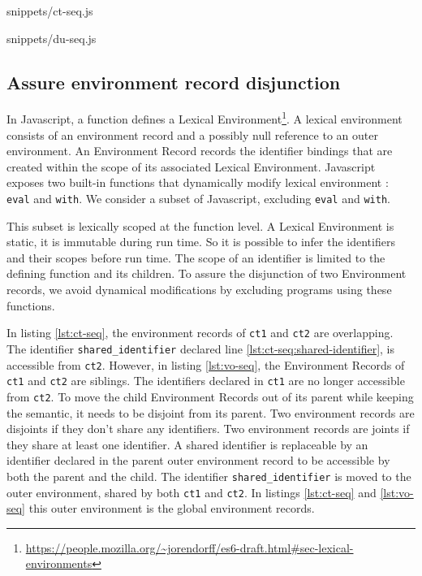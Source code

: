              {snippets/ct-seq.js}

             {snippets/du-seq.js}

\subsection{Assure environment record disjunction} \label{section:disjunction}

In Javascript, a function defines a Lexical Environment\footnote{\url{https://people.mozilla.org/~jorendorff/es6-draft.html\#sec-lexical-environments}}.
A lexical environment consists of an environment record and a possibly null reference to an outer environment.
An Environment Record records the identifier bindings that are created within the scope of its associated Lexical Environment.
Javascript exposes two built-in functions that dynamically modify lexical environment : \texttt{eval} and \texttt{with}.
We consider a subset of Javascript, excluding \texttt{eval} and \texttt{with}.

This subset is lexically scoped at the function level.
A Lexical Environment is static, it is immutable during run time.
So it is possible to infer the identifiers and their scopes before run time.
The scope of an identifier is limited to the defining function and its children.
To assure the disjunction of two Environment records, we avoid dynamical modifications by excluding programs using these functions.

In listing \ref{lst:ct-seq}, the environment records of \texttt{ct1} and \texttt{ct2} are overlapping.
The identifier \texttt{shared_identifier} declared line \ref{lst:ct-seq:shared-identifier}, is accessible from \texttt{ct2}.
However, in listing \ref{lst:vo-seq}, the Environment Records of \texttt{ct1} and \texttt{ct2} are siblings.
The identifiers declared in \texttt{ct1} are no longer accessible from \texttt{ct2}.
To move the child Environment Records out of its parent while keeping the semantic, it needs to be disjoint from its parent.
Two environment records are disjoints if they don't share any identifiers.
Two environment records are joints if they share at least one identifier.
A shared identifier is replaceable by an identifier declared in the parent outer environment record to be accessible by both the parent and the child.
The identifier \texttt{shared_identifier} is moved to the outer environment, shared by both \texttt{ct1} and \texttt{ct2}.
In listings \ref{lst:ct-seq} and \ref{lst:vo-seq} this outer environment is the global environment records.

